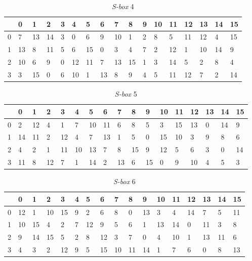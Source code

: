 \begin{table}[H]
	\caption{\textit{S-box} 4}\label{table:s_box4}
	\begin{center}
		\begin{tabular}{|l|l|l|l|l|l|l|l|l|l|l|l|l|l|l|l|l|}
				\hline
				& 0 & 1	& 2 & 3 & 4 & 5 & 6 & 7 & 8 & 9 & 10 & 11 & 12 & 13 & 14 & 15	\\ \hline
			0 & 7	&	13	&	14	&	3	&	0	&	6	&	9	&	10	&	1	&	2	&	8	&	5	&	11	&	12	&	4	&	15	\\ \hline
			1 & 13	&	8	&	11	&	5	&	6	&	15	&	0	&	3	&	4	&	7	&	2	&	12	&	1	&	10	&	14	&	9	\\ \hline
			2 & 10	&	6	&	9	&	0	&	12	&	11	&	7	&	13	&	15	&	1	&	3	&	14	&	5	&	2	&	8	&	4	\\ \hline
			3 & 3	&	15	&	0	&	6	&	10	&	1	&	13	&	8	&	9	&	4	&	5	&	11	&	12	&	7	&	2	&	14	\\ \hline
		\end{tabular}
	\end{center}
\end{table}

\begin{table}[H]
	\caption{\textit{S-box} 5}\label{table:s_box5}
	\begin{center}
		\begin{tabular}{|l|l|l|l|l|l|l|l|l|l|l|l|l|l|l|l|l|}
				\hline
				& 0 & 1	& 2 & 3 & 4 & 5 & 6 & 7 & 8 & 9 & 10 & 11 & 12 & 13 & 14 & 15	\\ \hline
			0	&	2	&	12	&	4	&	1	&	7	&	10	&	11	&	6	&	8	&	5	&	3	&	15	&	13	&	0	&	14	&	9	\\ \hline
			1	&	14	&	11	&	2	&	12	&	4	&	7	&	13	&	1	&	5	&	0	&	15	&	10	&	3	&	9	&	8	&	6	\\ \hline
			2	&	4	&	2	&	1	&	11	&	10	&	13	&	7	&	8	&	15	&	9	&	12	&	5	&	6	&	3	&	0	&	14	\\ \hline
			3	&	11	&	8	&	12	&	7	&	1	&	14	&	2	&	13	&	6	&	15	&	0	&	9	&	10	&	4	&	5	&	3	\\ \hline
		\end{tabular}
	\end{center}
\end{table}

\begin{table}[H]
	\caption{\textit{S-box} 6}\label{table:s_box6}
	\begin{center}
		\begin{tabular}{|l|l|l|l|l|l|l|l|l|l|l|l|l|l|l|l|l|}
				\hline
				& 0 & 1	& 2 & 3 & 4 & 5 & 6 & 7 & 8 & 9 & 10 & 11 & 12 & 13 & 14 & 15	\\ \hline
			0	&	12	&	1	&	10	&	15	&	9	&	2	&	6	&	8	&	0	&	13	&	3	&	4	&	14	&	7	&	5	&	11	\\ \hline
			1	&	10	&	15	&	4	&	2	&	7	&	12	&	9	&	5	&	6	&	1	&	13	&	14	&	0	&	11	&	3	&	8	\\ \hline
			2	&	9	&	14	&	15	&	5	&	2	&	8	&	12	&	3	&	7	&	0	&	4	&	10	&	1	&	13	&	11	&	6	\\ \hline
			3	&	4	&	3	&	2	&	12	&	9	&	5	&	15	&	10	&	11	&	14	&	1	&	7	&	6	&	0	&	8	&	13	\\ \hline
		\end{tabular}
	\end{center}
\end{table}

